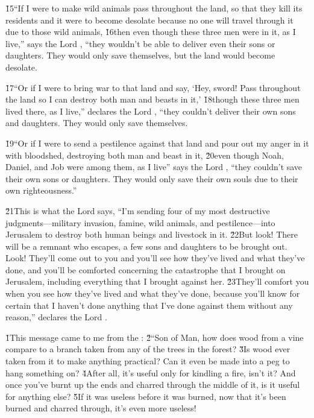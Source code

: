 \v{15}``If I were to make wild animals pass throughout the land, so that they kill its residents and it were to become desolate because no one will travel through it due to those wild animals, \v{16}then even though these three men were in it, as I live,'' says the Lord , ``they wouldn't be able to deliver even their sons or daughters. They would only save themselves, but the land would become desolate.

\v{17}``Or if I were to bring war to that land and say, `Hey, sword! Pass throughout the land so I can destroy both man and beasts in it,' \v{18}though these three men lived there, as I live,'' declares the Lord , ``they couldn't deliver their own sons and daughters. They would only save themselves.

\v{19}``Or if I were to send a pestilence against that land and pour out my anger in it with bloodshed, destroying both man and beast in it, \v{20}even though Noah, Daniel, and Job were among them, as I live'' says the Lord , ``they couldn't save their own sons or daughters. They would only save their own souls due to their own righteousness.''

\v{21}This is what the Lord  says, ``I'm sending four of my most destructive judgments---military invasion, famine, wild animals, and pestilence---into Jerusalem to destroy both human beings and livestock in it. \v{22}But look! There will be a remnant who escapes, a few sons and daughters to be brought out. Look! They'll come out to you and you'll see how they've lived and what they've done, and you'll be comforted concerning the catastrophe that I brought on Jerusalem, including everything that I brought against her. \v{23}They'll comfort you when you see how they've lived and what they've done, because you'll know for certain that I haven't done anything that I've done against them without any reason,'' declares the Lord .

\v{1}This message came to me from the : \v{2}``Son of Man, how does wood from a vine compare to a branch taken from any of the trees in the forest? \v{3}Is wood ever taken from it to make anything practical? Can it even be made into a peg to hang something on? \v{4}After all, it's useful only for kindling a fire, isn't it? And once you've burnt up the ends and charred through the middle of it, is it useful for anything else? \v{5}If it was useless before it was burned, now that it's been burned and charred through, it's even more useless!

